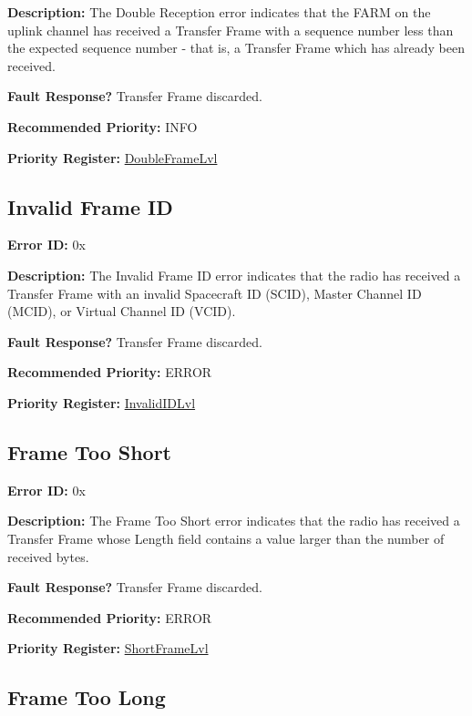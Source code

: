 \documentclass{hitec}
\newcounter{idval}
\newcommand*{\elyid}[0]{0x\padzeroes[2]\Hexadecimal{idval}\addtocounter{idval}{1}}
\begin{document}
\noindent \textbf{Description:} The Double Reception error indicates that the
FARM on the uplink channel has received a Transfer Frame with a sequence number
less than the expected sequence number - that is, a Transfer Frame which has
already been received.

\noindent \textbf{Fault Response?} Transfer Frame discarded.

\noindent \textbf{Recommended Priority:} INFO

\noindent \textbf{Priority Register:}
\hyperref[reg:doubleframelvl]{DoubleFrameLvl}

\subsection{Invalid Frame ID}
\label{err:sdlpids}

\noindent \textbf{Error ID:} \elyid 

\noindent \textbf{Description:} The Invalid Frame ID error indicates that the 
radio has received a Transfer Frame with an invalid Spacecraft ID (SCID),
Master Channel ID (MCID), or Virtual Channel ID (VCID).

\noindent \textbf{Fault Response?} Transfer Frame discarded.

\noindent \textbf{Recommended Priority:} ERROR

\noindent \textbf{Priority Register:} \hyperref[reg:invalididlvl]{InvalidIDLvl}

\subsection{Frame Too Short}
\label{err:sdlpshort}

\noindent \textbf{Error ID:} \elyid 

\noindent \textbf{Description:} The Frame Too Short error indicates that the 
radio has received a Transfer Frame whose Length field contains a value larger
than the number of received bytes.

\noindent \textbf{Fault Response?} Transfer Frame discarded.

\noindent \textbf{Recommended Priority:} ERROR

\noindent \textbf{Priority Register:}
\hyperref[reg:shortframelvl]{ShortFrameLvl}

\subsection{Frame Too Long}
\label{err:sdlplong}
\end{document}
